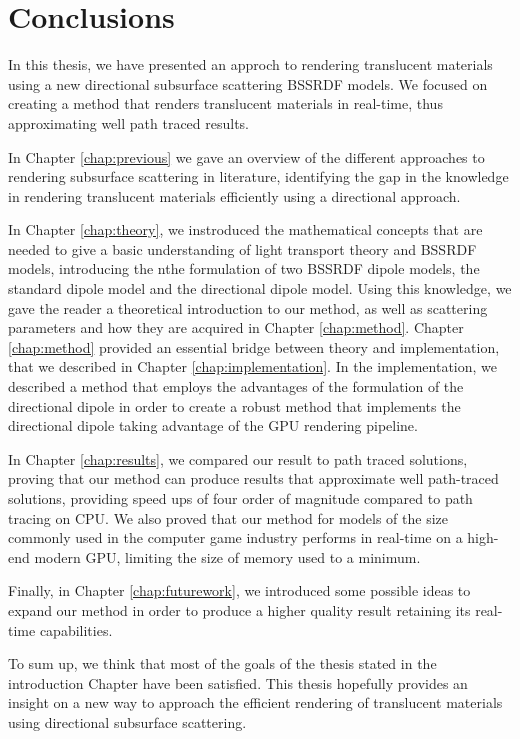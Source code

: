 \chapter{Conclusions}
\label{chap:conclusions}

In this thesis, we have presented an approch to rendering translucent materials using a new directional subsurface scattering BSSRDF models. We focused on creating a method that renders translucent materials in real-time, thus approximating well path traced results.

In Chapter \ref{chap:previous} we gave an overview of the different approaches to rendering subsurface scattering in literature, identifying the gap in the knowledge in rendering translucent materials efficiently using a directional approach.

In Chapter \ref{chap:theory}, we instroduced the mathematical concepts that are needed to give a basic understanding of light transport theory and BSSRDF models, introducing the nthe formulation of two BSSRDF dipole models, the standard dipole model and the directional dipole model. Using this knowledge, we gave the reader a theoretical introduction to our method, as well as scattering parameters and how they are acquired in Chapter \ref{chap:method}. Chapter \ref{chap:method} provided an essential bridge between theory and implementation, that we described in Chapter \ref{chap:implementation}. In the implementation, we described a method that employs the advantages of the formulation of the directional dipole in order to create a robust method that implements the directional dipole taking advantage of the GPU rendering pipeline.

In Chapter \ref{chap:results}, we compared our result to path traced solutions, proving that our method can produce results that approximate well path-traced solutions, providing speed ups of four order of magnitude compared to path tracing on CPU. We also proved that our method for models of the size commonly used in the computer game industry performs in real-time on a high-end modern GPU, limiting the size of memory used to a minimum. 

Finally, in Chapter	\ref{chap:futurework}, we introduced some possible ideas to expand our method in order to produce a higher quality result retaining its real-time capabilities.

To sum up, we think that most of the goals of the thesis stated in the introduction Chapter have been satisfied. This thesis hopefully provides an insight on a new way to approach the efficient rendering of translucent materials using directional subsurface scattering. 